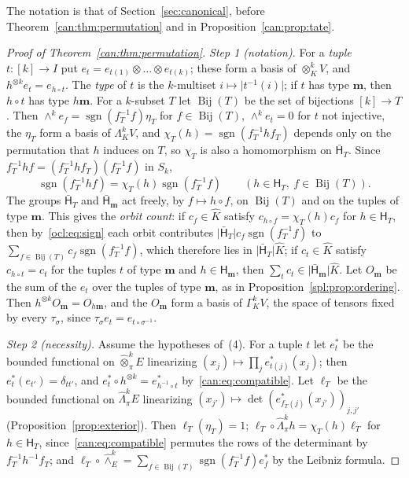 \documentclass[11pt]{amsart}
\theoremstyle{definition}
\theoremstyle{remark}
\numberwithin{equation}{section}
\newcommand{\sgn}{\operatorname{sgn}}
\newcommand{\abs}[1]{\lvert #1\rvert}
\newcommand{\Kh}{\widehat K}
\theoremstyle{plain}
\theoremstyle{definition}
\theoremstyle{plain}
\begin{document}
The notation is that of Section~\ref{sec:canonical}, before Theorem~\ref{can:thm:permutation} and in
Proposition~\ref{can:prop:tate}.

\begin{proof}[Proof of Theorem~\ref{can:thm:permutation}]
\emph{Step 1 (notation).} For a \emph{tuple} $t\colon[k]\to I$ put $e_t=e_{t(1)}\otimes\dots\otimes e_{t(k)}$; these
form a basis of $\otimes^k_KV$, and $h^{\otimes k}e_t=e_{h\circ t}$. The \emph{type} of $t$ is the $k$-multiset
$i\mapsto\abs{t^{-1}(i)}$; if $t$ has type $\mathbf m$, then $h\circ t$ has type $h\mathbf m$. For a $k$-subset $T$ let
$\operatorname{Bij}(T)$ be the set of bijections $[k]\to T$. Then $\wedge^ke_f=\sgn(f_T^{-1}f)\eta_T$ for
$f\in\operatorname{Bij}(T)$, $\wedge^ke_t=0$ for $t$ not injective, the $\eta_T$ form a basis of $\Lambda^k_KV$, and
$\chi_T(h)=\sgn(f_T^{-1}hf_T)$ depends only on the permutation that $h$ induces on $T$, so $\chi_T$ is also a
homomorphism on $\bar{\mathsf H}_T$. Since $f_T^{-1}hf=(f_T^{-1}hf_T)(f_T^{-1}f)$ in $S_k$,
\begin{equation}\label{ocl:eq:sign}
 \sgn(f_T^{-1}hf)=\chi_T(h)\sgn(f_T^{-1}f)\qquad(h\in\mathsf H_T,\ f\in\operatorname{Bij}(T)).
\end{equation}
The groups $\bar{\mathsf H}_T$ and $\bar{\mathsf H}_{\mathbf m}$ act freely, by $f\mapsto h\circ f$, on
$\operatorname{Bij}(T)$ and on the tuples of type $\mathbf m$. This gives the \emph{orbit count}: if $c_f\in\Kh$ satisfy
$c_{h\circ f}=\chi_T(h)c_f$ for $h\in\mathsf H_T$, then by~\eqref{ocl:eq:sign} each orbit contributes $\abs{\bar{\mathsf
H}_T}c_f\sgn(f_T^{-1}f)$ to $\sum_{f\in\operatorname{Bij}(T)}c_f\sgn(f_T^{-1}f)$, which therefore lies in
$\abs{\bar{\mathsf H}_T}\Kh$; if $c_t\in\Kh$ satisfy $c_{h\circ t}=c_t$ for the tuples $t$ of type $\mathbf m$ and
$h\in\mathsf H_{\mathbf m}$, then $\sum_tc_t\in\abs{\bar{\mathsf H}_{\mathbf m}}\Kh$. Let $O_{\mathbf m}$ be the sum of
the $e_t$ over the tuples of type $\mathbf m$, as in Proposition~\ref{spl:prop:ordering}. Then $h^{\otimes k}O_{\mathbf
m}=O_{h\mathbf m}$, and the $O_{\mathbf m}$ form a basis of $\Gamma^k_KV$, the space of tensors fixed by every
$\tau_\sigma$, since $\tau_\sigma e_t=e_{t\circ\sigma^{-1}}$.

\emph{Step 2 (necessity).} Assume the hypotheses of~(4). For a tuple $t$ let $e^*_t$ be the bounded functional on
$\widehat\otimes^k_\pi E$ linearizing $(x_j)\mapsto\prod_je^*_{t(j)}(x_j)$; then $e^*_t(e_{t'})=\delta_{tt'}$, and
$e^*_t\circ h^{\otimes k}=e^*_{h^{-1}\circ t}$ by~\eqref{can:eq:compatible}. Let $\ell_T$ be the bounded functional on
$\widehat\Lambda^k_\pi E$ linearizing $(x_{j'})\mapsto\det(e^*_{f_T(j)}(x_{j'}))_{j,j'}$
(Proposition~\ref{prop:exterior}). Then $\ell_T(\eta_T)=1$; $\ell_T\circ\widehat\Lambda^k_\pi h=\chi_T(h)\ell_T$ for
$h\in\mathsf H_T$, since~\eqref{can:eq:compatible} permutes the rows of the determinant by $f_T^{-1}h^{-1}f_T$; and
$\ell_T\circ\widehat\wedge^k_E=\sum_{f\in\operatorname{Bij}(T)}\sgn(f_T^{-1}f)e^*_f$ by the Leibniz formula.


\end{proof}
\end{document}

